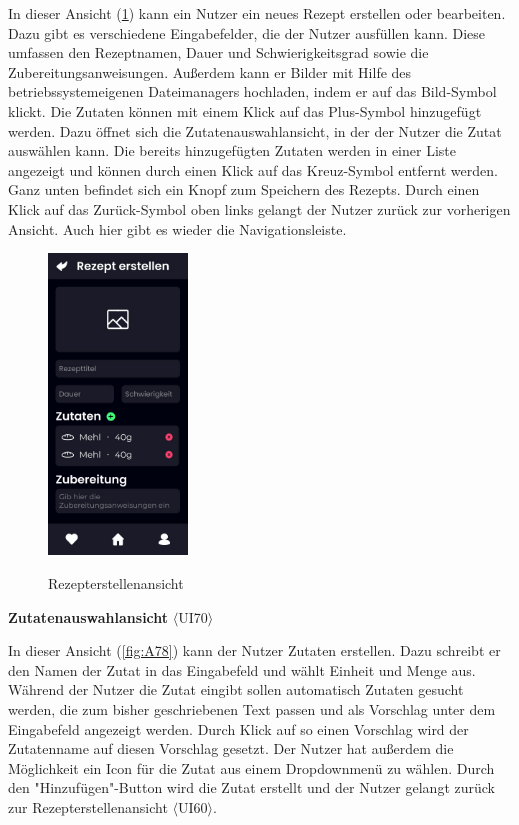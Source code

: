 \documentclass[parskip=full]{scrartcl}
\begin{document}
In dieser Ansicht (\ref{fig:A77}) kann ein Nutzer ein neues Rezept erstellen oder bearbeiten. Dazu gibt es verschiedene Eingabefelder, die der Nutzer ausfüllen kann. Diese umfassen den Rezeptnamen, Dauer und Schwierigkeitsgrad sowie die Zubereitungsanweisungen. Außerdem kann er Bilder mit Hilfe des betriebssystemeigenen Dateimanagers hochladen, indem er auf das Bild-Symbol klickt. 
Die Zutaten können mit einem Klick auf das Plus-Symbol hinzugefügt werden. Dazu öffnet sich die Zutatenauswahlansicht, in der der Nutzer die Zutat auswählen kann. Die bereits hinzugefügten Zutaten werden in einer Liste angezeigt und können durch einen Klick auf das Kreuz-Symbol entfernt werden. Ganz unten befindet sich ein Knopf zum Speichern des Rezepts. Durch einen Klick auf das Zurück-Symbol oben links gelangt der Nutzer zurück zur vorherigen Ansicht. Auch hier gibt es wieder die Navigationsleiste.

\begin{figure}[!htp]
    \centering
    \includegraphics[height=80mm]{images/section7/RecipeCreationView.jpg}
    \label{fig:A77}
    \caption{Rezepterstellenansicht}
\end{figure}

\textbf{Zutatenauswahlansicht} $\langle$UI70$\rangle$

In dieser Ansicht (\ref{fig:A78}) kann der Nutzer Zutaten erstellen. Dazu schreibt er den Namen der Zutat in das Eingabefeld und wählt Einheit und Menge aus. Während der Nutzer die Zutat eingibt sollen automatisch Zutaten gesucht werden, die zum bisher geschriebenen Text passen und als Vorschlag unter dem Eingabefeld angezeigt werden. Durch Klick auf so einen Vorschlag wird der Zutatenname auf diesen Vorschlag gesetzt. Der Nutzer hat außerdem die Möglichkeit ein Icon für die Zutat aus einem Dropdownmenü zu wählen. Durch den "Hinzufügen"-Button wird die Zutat erstellt und der Nutzer gelangt zurück zur Rezepterstellenansicht $\langle$UI60$\rangle$.
\end{document}
